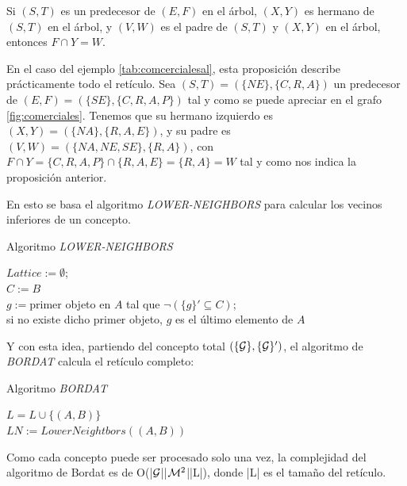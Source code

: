 \documentclass[oneside,openright,titlepage,numbers=noenddot,openany,headinclude,footinclude=true,
cleardoublepage=empty,abstractoff,BCOR=5mm,paper=a4,fontsize=12pt,main=spanish]{scrreprt}
\begin{document}
\begin{proposition}
Si $(S,T)$ es un predecesor de $(E,F)$ en el árbol, $(X,Y)$ es hermano de $(S,T)$ en el árbol, y $(V,W)$ es el padre de $(S,T)$ y $(X,Y)$ en el árbol, entonces $F \cap Y = W$.
\end{proposition}

En el caso del ejemplo \ref{tab:comcercialesal}, esta proposición describe prácticamente todo el retículo. Sea $(S,T)=(\{NE\},\{C,R,A\})$ un predecesor de $(E,F)= (\{SE\},\{C,R,A,P\})$ tal y como se puede apreciar en el grafo \ref{fig:comerciales}. Tenemos que su hermano izquierdo es $(X,Y)=(\{NA\},\{R,A,E\})$, y su padre es $(V,W)=(\{NA,NE,SE\},\{R,A\})$, con $F \cap Y = \{C,R,A,P\}\cap \{R,A,E\}=\{R,A\}=W$ tal y como nos indica la proposición anterior. 

En esto se basa el algoritmo \textit{LOWER-NEIGHBORS} \cite{comparingperformance} para calcular los vecinos inferiores de un concepto. 

\begin{algorithm}[H]
\caption{Algoritmo \textit{LOWER-NEIGHBORS}}
\label{code:lowerneighbors}
     $ Lattice := \emptyset$;\\
     $C:= B$\\
     $g:=$primer objeto en $A$ tal que $\neg(\{g\}' \subseteq C) $;\\
     si no existe dicho primer objeto, $g$ es el último elemento de $A$\\

\end{algorithm}

Y con esta idea, partiendo del concepto total $(\{\mathcal{G}\},\{\mathcal{G}\}')$, el algoritmo de \textit{BORDAT} \cite{comparingperformance} calcula el retículo completo:

\begin{algorithm}[H]
\caption{Algoritmo \textit{BORDAT}}
\label{code:bordat}
     $L=L\cup \{(A,B)\}$\\
     $LN:=LowerNeightbors((A,B))$\\
     


\end{algorithm}
Como cada concepto puede ser procesado solo una vez, la complejidad del algoritmo de Bordat es de O(|$\mathcal{G}$||$\mathcal{M}^2$||L|), donde |L| es el tamaño del retículo.
\end{document}
